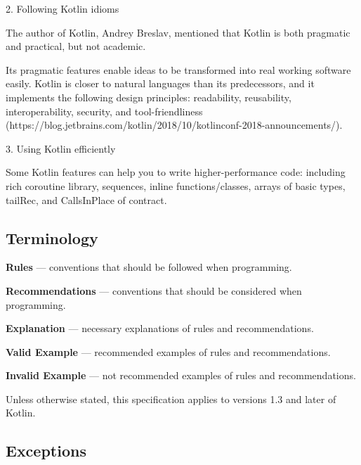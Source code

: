 2. Following Kotlin idioms



    The author of Kotlin, Andrey Breslav, mentioned that Kotlin is both pragmatic and practical, but not academic. 

    Its pragmatic features enable ideas to be transformed into real working software easily. Kotlin is closer to natural languages than its predecessors, and it implements the following design principles: readability, reusability, interoperability, security, and tool-friendliness (https://blog.jetbrains.com/kotlin/2018/10/kotlinconf-2018-announcements/).



3. Using Kotlin efficiently



    Some Kotlin features can help you to write higher-performance code: including rich coroutine library, sequences, inline functions/classes, arrays of basic types, tailRec, and CallsInPlace of contract.



\subsection*{\textbf{Terminology}}

\label{sec:}



\textbf{Rules} — conventions that should be followed when programming.



\textbf{Recommendations} — conventions that should be considered when programming.



\textbf{Explanation} — necessary explanations of rules and recommendations.



\textbf{Valid Example} — recommended examples of rules and recommendations.



\textbf{Invalid Example} — not recommended examples of rules and recommendations.



Unless otherwise stated, this specification applies to versions 1.3 and later of Kotlin.



\subsection*{\textbf{Exceptions}}

